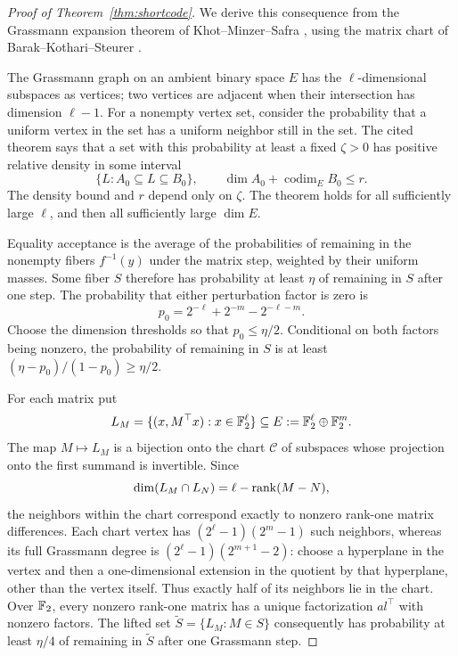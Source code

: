 \begin{proof}[Proof of Theorem~\ref{thm:shortcode}]
We derive this consequence from the Grassmann expansion theorem of
Khot--Minzer--Safra \cite[Theorem~1.12 in the 2018 revision]{KMS23},
using the matrix chart of Barak--Kothari--Steurer
\cite[Definition~3.2 and Lemmas~3.3--3.7]{BKS18}.

The Grassmann graph on an ambient binary space $E$ has the
$\ell$-dimensional subspaces as vertices; two vertices are adjacent when
their intersection has dimension $\ell-1$.  For a
nonempty vertex set, consider the probability that a uniform vertex in the set
has a uniform neighbor still in the set.  The cited theorem says that a
set with this probability at least a fixed $\zeta>0$ has positive relative
density in some interval
\[
 \{L:A_0\subseteq L\subseteq B_0\},
 \qquad \dim A_0+\operatorname{codim}_E B_0\le r.
\]
The density bound and $r$ depend only on $\zeta$.  The theorem holds for
all sufficiently large $\ell$, and then all sufficiently large
$\dim E$.

Equality acceptance is the average of the probabilities of remaining in the
nonempty fibers $f^{-1}(y)$ under the matrix step, weighted by their
uniform masses.  Some fiber $S$ therefore has probability at least $\eta$ of remaining in $S$ after one step.
The probability that either perturbation factor is zero is
\[
 p_0=2^{-\ell}+2^{-m}-2^{-\ell-m}.
\]
Choose the dimension thresholds so that $p_0\le\eta/2$.  Conditional on
both factors being nonzero, the probability of remaining in $S$ is at least
$(\eta-p_0)/(1-p_0)\ge\eta/2$.

For each matrix put
\[
 L_M=\{(x,M^\top x):x\in\mathbb F_2^\ell\}
 \subseteq E:=\mathbb F_2^\ell\oplus\mathbb F_2^m.
\]
The map $M\mapsto L_M$ is a bijection onto the chart $\mathcal C$ of
subspaces whose projection onto the first summand is invertible.  Since
\[
 \dim(L_M\cap L_N)=\ell-\operatorname{rank}(M-N),
\]
the neighbors within the chart correspond exactly to nonzero rank-one
matrix differences.  Each chart vertex has
$(2^\ell-1)(2^m-1)$ such neighbors, whereas its full Grassmann degree is
$(2^\ell-1)(2^{m+1}-2)$: choose a hyperplane in the vertex and then a
one-dimensional extension in the quotient by that hyperplane, other than
the vertex itself.  Thus exactly
half of its neighbors lie in the chart.  Over $\mathbb F_2$, every nonzero
rank-one matrix has a unique factorization $a l^\top$ with nonzero
factors.  The lifted set $\widetilde S=\{L_M:M\in S\}$ consequently has
probability at least $\eta/4$ of remaining in $\widetilde S$ after one Grassmann step.


\end{proof}

